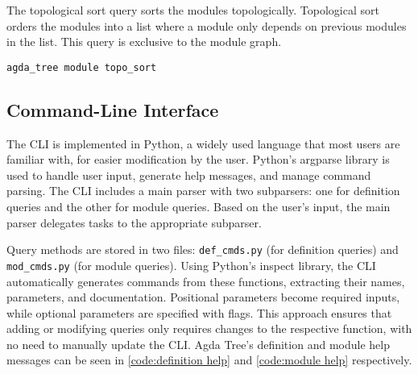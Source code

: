 The topological sort query sorts the modules topologically. Topological sort
orders the modules into a list where a module only depends on previous modules
in the list. This query is exclusive to the module graph. 

\noindent
\begin{minipage}{\textwidth}
\begin{lstlisting}
agda_tree module topo_sort
\end{lstlisting}
\end{minipage}


\subsection{Command-Line Interface}\label{sub:Agda Tree CLI}

The CLI is implemented in Python, a widely used language that most users are
familiar with, for easier modification by the user. Python's
argparse library is used to handle user input, generate help messages, and
manage command parsing. The CLI includes a main parser with two subparsers: one
for definition queries and the other for module queries. Based on the user’s
input, the main parser delegates tasks to the appropriate subparser.

Query methods are stored in two files: \texttt{def\_cmds.py} (for definition
queries) and \texttt{mod\_cmds.py} (for module queries). Using Python’s inspect
library, the CLI automatically generates commands from these functions,
extracting their names, parameters, and documentation. Positional parameters
become required inputs, while optional parameters are specified with flags.
This approach ensures that adding or modifying queries only requires changes to
the respective function, with no need to manually update the CLI. Agda Tree's
definition and module help messages can be seen in \cref{code:definition help}
and \cref{code:module help} respectively.


